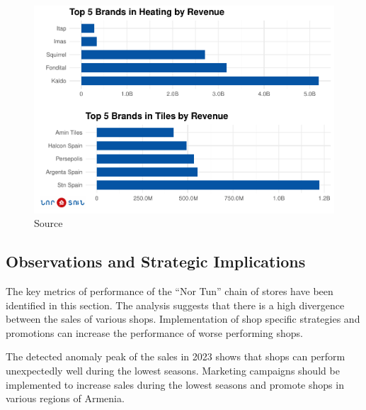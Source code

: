 \documentclass[conference]{IEEEtran}
\begin{document}
\begin{figure}[htbp]
\centering
\includegraphics[width=\columnwidth,keepaspectratio]{./figures/top_5_tiles_heating.pdf}
\caption{Source \cite{TilesHeating}}
\label{fig:top_5_tiles_heating}
\end{figure}


\subsection{Observations and Strategic Implications}
The key metrics of performance of the ``Nor Tun'' chain of stores have been identified in this section. The analysis suggests that there is a high divergence between the sales of various shops. Implementation of shop specific strategies and promotions can increase the performance of worse performing shops. 

The detected anomaly peak of the sales in 2023 shows that shops can perform unexpectedly well during the lowest seasons. Marketing campaigns should be implemented to increase sales during the lowest seasons and promote shops in various regions of Armenia.


\end{document}
